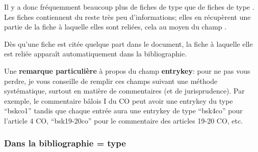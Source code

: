\documentclass[a4paper]{ltxdockit}[2011/03/25]
\newcommand{\GM}{\enquote}
\newcommand{\Pex}{\textnormal{Par exemple}\xspace}
\begin{document}
Il y a donc fréquemment beaucoup plus de fiches de type  que de fiches de type . Les fiches  contiennent du reste très peu d'informations; elles en récupèrent une partie de la fiche  à laquelle elles sont reliées, cela au moyen du champ .

Dès qu'une fiche  est citée quelque part dans le document, la fiche  à laquelle elle est reliée apparaît automatiquement dans la bibliographie.

\label{entrykeysyst}Une \textbf{remarque particulière} à propos du champ \textbf{entrykey}: pour ne pas vous perdre, je vous conseille de remplir ces champs suivant une méthode systématique, surtout en matière de commentaires (et de jurisprudence). \Pex, le commentaire bâlois I du CO peut avoir une entrykey du type \GM{bskco1} tandis que chaque entrée aura une entrykey de type \GM{bsk4co} pour l'article 4 CO, \GM{bsk19-20co} pour le commentaire des articles 19-20 CO, etc.

\subsubsection{Dans la bibliographie = type }
\end{document}

